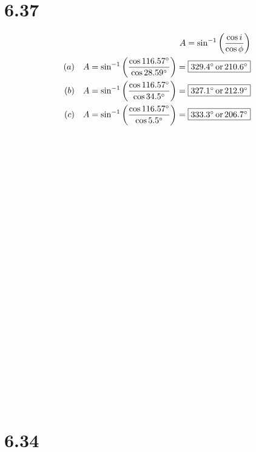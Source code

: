 \documentclass[12 pt]{article}
\begin{document}
\section*{6.37}
\begin{align*}
    A = \sin^{-1}\left(\frac{\cos{i}}{\cos{\phi}}\right) \\
    (a) \quad A = \sin^{-1}\left(\frac{\cos{116.57^\circ}}{\cos{28.59^\circ}}\right) = \fbox{$329.4^\circ \, \text{or} \, 210.6^\circ$} \\
    (b) \quad A = \sin^{-1}\left(\frac{\cos{116.57^\circ}}{\cos{34.5^\circ}}\right) = \fbox{$327.1^\circ \, \text{or} \, 212.9^\circ$} \\
    (c) \quad A = \sin^{-1}\left(\frac{\cos{116.57^\circ}}{\cos{5.5^\circ}}\right) = \fbox{$333.3^\circ \, \text{or} \, 206.7^\circ$}
\end{align*}
\\ \\ \\ \\ \\ \\ \\ \\ \\ \\ \\ \\ \\ \\ \\ \\ \\ \\ \\  \\ \\ \\ \\
\section*{6.34}
\end{document}
